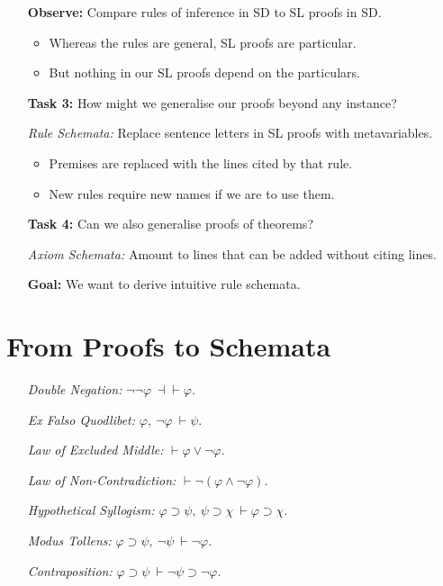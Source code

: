 \documentclass[a4paper, 11pt]{article} %
\begin{document}
\begin{enumerate}
  \item[\bf Observe:] Compare rules of inference in SD to SL proofs in SD.
    \begin{itemize}
      \item Whereas the rules are general, SL proofs are particular.
      \item But nothing in our SL proofs depend on the particulars.
    \end{itemize}
  \item[\bf Task 3:] How might we generalise our proofs beyond any instance?
  \item[\it Rule Schemata:] Replace sentence letters in SL proofs with metavariables.
    \begin{itemize}
      \item Premises are replaced with the lines cited by that rule.
      \item New rules require new names if we are to use them.
    \end{itemize}
  \item[\bf Task 4:] Can we also generalise proofs of theorems?
  \item[\it Axiom Schemata:] Amount to lines that can be added without citing lines. 
  \item[\bf Goal:] We want to derive intuitive rule schemata.
\end{enumerate}


\section*{From Proofs to Schemata}

\begin{enumerate}[leftmargin=1.5in]
  \item[\it Double Negation:] $\neg\neg\varphi\ \dashv\vdash \varphi$.
  \item[\it Ex Falso Quodlibet:] $\varphi,\ \neg\varphi\ \vdash \psi$.
  \item[\it Law of Excluded Middle:] $\vdash \varphi\vee\neg\varphi$.
  \item[\it Law of Non-Contradiction:] $\vdash \neg(\varphi\wedge\neg\varphi)$.
  \item[\it Hypothetical Syllogism:] $\varphi \supset \psi,\ \psi \supset \chi\ \vdash \varphi \supset \chi$.
  \item[\it Modus Tollens:] $\varphi \supset \psi,\ \neg\psi\ \vdash \neg\varphi$.
  \item[\it Contraposition:] $\varphi \supset \psi\ \vdash \neg\psi \supset \neg\varphi$.
\end{enumerate}
\end{document}
